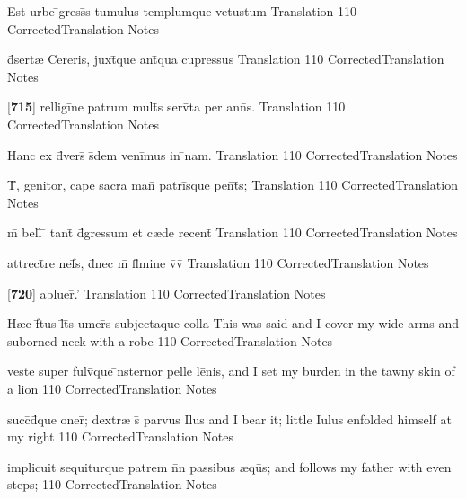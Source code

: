 \latline
  {Est urbe \={}gress\={\macron {\i}}s tumulus templumque vetustum}
  { Translation }
  {110}
  { CorrectedTranslation }
  { Notes }


\latline
  {d\={}sert{\ae} Cereris, juxt\={}que ant\={\macron {\i}}qua cupressus}
  { Translation }
  {110}
  { CorrectedTranslation }
  { Notes }


\latline
  {[\textbf{715}] relligi\={}ne patrum mult\={}s serv\={}ta per ann\={}s.}
  { Translation }
  {110}
  { CorrectedTranslation }
  { Notes }


\latline
  {Hanc ex d\={\macron {\i}}vers\={} s\={}dem veni\={}mus in \={}nam.}
  { Translation }
  {110}
  { CorrectedTranslation }
  { Notes }


\latline
  {T\={}, genitor, cape sacra man\={} patri\={}sque pen\={}t\={\macron {\i}}s;}
  { Translation }
  {110}
  { CorrectedTranslation }
  { Notes }


\latline
  {m\={} bell\={} \={} tant\={} d\={\macron {\i}}gressum et c{\ae}de recent\={\macron {\i}}}
  { Translation }
  {110}
  { CorrectedTranslation }
  { Notes }


\latline
  {attrect\={}re nef\={}s, d\={}nec m\={} fl\={}mine v\={\macron {\i}}v\={}}
  { Translation }
  {110}
  { CorrectedTranslation }
  { Notes }


\latline
  {[\textbf{720}] abluer\={}.'}
  { Translation }
  {110}
  { CorrectedTranslation }
  { Notes }


\latline
  {H{\ae}c f\={}tus l\={}t\={}s umer\={}s subjectaque colla}
  { This was said and I cover my wide arms and suborned neck with a robe }
  {110}
  { CorrectedTranslation }
  { Notes }


\latline
  {veste super fulv\={\macron {\i}}que \={\macron {\i}}nsternor pelle le\={}nis,}
  { and I set my burden in the tawny skin of a lion }
  {110}
  { CorrectedTranslation }
  { Notes }


\latline
  {succ\={}d\={}que oner\={\macron {\i}}; dextr{\ae} s\={} parvus I\={}lus}
  { and I bear it; little Iulus enfolded himself at my right }
  {110}
  { CorrectedTranslation }
  { Notes }


\latline
  {implicuit sequiturque patrem n\={}n passibus {\ae}qu\={\macron {\i}}s;}
  { and follows my father with even steps; }
  {110}
  { CorrectedTranslation }
  { Notes }


